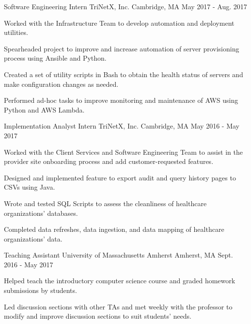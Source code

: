 \begin{cventries}
    \vspace{-10pt}
  \cventry
    {Software Engineering Intern}
    {TriNetX, Inc.}
    {Cambridge, MA}
    {May 2017 - Aug. 2017}
    {
      \begin{cvitems}
        \item {Worked with the Infrastructure Team to develop automation and deployment utilities.}
        \item {Spearheaded project to improve and increase automation of server provisioning process using Ansible and Python.}
        \item {Created a set of utility scripts in Bash to obtain the health status of servers and make configuration changes as needed.}
        \item{ Performed ad-hoc tasks to improve monitoring and maintenance of AWS using Python and AWS Lambda.}
      \end{cvitems}
    }

\vspace{-18pt}

  \cventry
    {Implementation Analyst Intern}
    {TriNetX, Inc.}
    {Cambridge, MA}
    {May 2016 - May 2017}
    {
      \begin{cvitems}
        \item {Worked with the Client Services and Software Engineering Team to assist in the provider site onboarding process and add customer-requested features.}
        \item {Designed and implemented feature to export audit and query history pages to CSVs using Java.}
        \item{Wrote and tested SQL Scripts to assess the cleanliness of healthcare organizations’ databases.}
        \item{Completed data refreshes, data ingestion, and data mapping of healthcare organizations' data.}
      \end{cvitems}
    }
    
    \vspace{-18pt}

  \cventry
    {Teaching Assistant}
    {University of Massachusetts Amherst}
    {Amherst, MA}
    {Sept. 2016 - May 2017}
    {
      \begin{cvitems}
        \item {Helped teach the introductory computer science course and graded homework submissions by students.}
        \item{Led discussion sections with other TAs and met weekly with the professor to modify and improve discussion sections to suit students’ needs.}
      \end{cvitems}
    }
    \vspace{-18pt}


\end{cventries}
